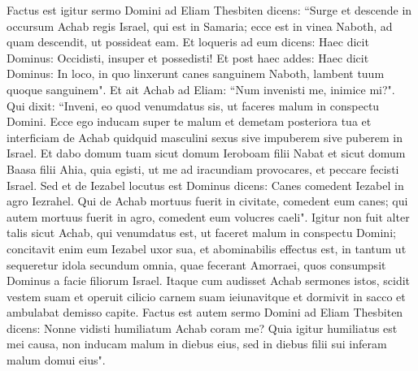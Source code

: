 \begin{biblechapter}
\verse Factus est igitur sermo Domini ad Eliam Thesbiten dicens: 
\verse “Surge et descende in occursum Achab regis Israel, qui est in Samaria; ecce est in vinea Naboth, ad quam descendit, ut possideat eam. 
\verse Et loqueris ad eum dicens: Haec dicit Dominus: Occidisti, insuper et possedisti! Et post haec addes: Haec dicit Dominus: In loco, in quo linxerunt canes sanguinem Naboth, lambent tuum quoque sanguinem". 
\verse Et ait Achab ad Eliam: “Num invenisti me, inimice mi?". Qui dixit: “Inveni, eo quod venumdatus sis, ut faceres malum in conspectu Domini. 
\verse Ecce ego inducam super te malum et demetam posteriora tua et interficiam de Achab quidquid masculini sexus sive impuberem sive puberem in Israel. 
\verse Et dabo domum tuam sicut domum Ieroboam filii Nabat et sicut domum Baasa filii Ahia, quia egisti, ut me ad iracundiam provocares, et peccare fecisti Israel. 
\verse Sed et de Iezabel locutus est Dominus dicens: Canes comedent Iezabel in agro Iezrahel. 
\verse Qui de Achab mortuus fuerit in civitate, comedent eum canes; qui autem mortuus fuerit in agro, comedent eum volucres caeli". 
\verse Igitur non fuit alter talis sicut Achab, qui venumdatus est, ut faceret malum in conspectu Domini; concitavit enim eum Iezabel uxor sua, 
\verse et abominabilis effectus est, in tantum ut sequeretur idola secundum omnia, quae fecerant Amorraei, quos consumpsit Dominus a facie filiorum Israel. 
\verse Itaque cum audisset Achab sermones istos, scidit vestem suam et operuit cilicio carnem suam ieiunavitque et dormivit in sacco et ambulabat demisso capite. 
\verse Factus est autem sermo Domini ad Eliam Thesbiten dicens: 
\verse Nonne vidisti humiliatum Achab coram me? Quia igitur humiliatus est mei causa, non inducam malum in diebus eius, sed in diebus filii sui inferam malum domui eius". 
\end{biblechapter}

